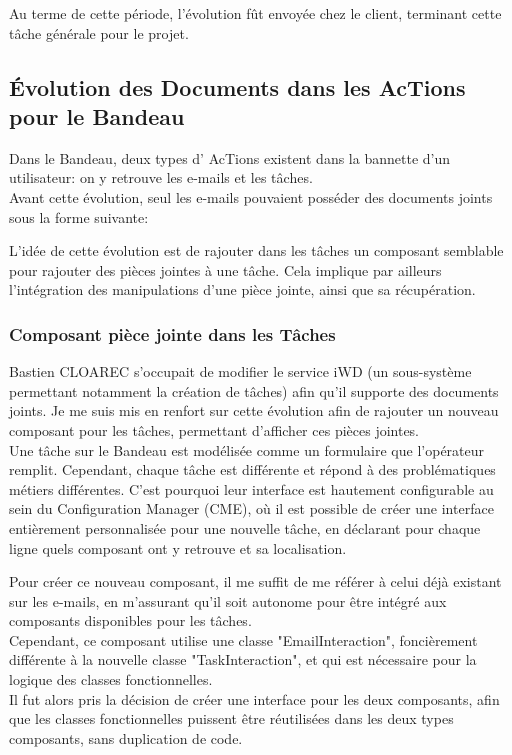 \documentclass{rapport}
\begin{document}
Au terme de cette période, l'évolution fût envoyée chez le client, terminant cette tâche générale pour le projet.

\newpage
\subsection{Évolution des Documents dans les AcTions pour le Bandeau}

Dans le Bandeau, deux types d' AcTions existent dans la bannette d'un utilisateur: on y retrouve les e-mails et les tâches.\\
Avant cette évolution, seul les e-mails pouvaient posséder des documents joints sous la forme suivante:


L'idée de cette évolution est de rajouter dans les tâches un composant semblable pour rajouter des pièces jointes à une tâche. Cela implique par ailleurs l'intégration des manipulations d'une pièce jointe, ainsi que sa récupération.\\

\subsubsection{Composant pièce jointe dans les Tâches}

Bastien CLOAREC s'occupait de modifier le service iWD (un sous-système permettant notamment la création de tâches) afin qu'il supporte des documents joints. Je me suis mis en renfort sur cette évolution afin de rajouter un nouveau composant pour les tâches, permettant d'afficher ces pièces jointes.\\

Une tâche sur le Bandeau est modélisée comme un formulaire que l'opérateur remplit. Cependant, chaque tâche est différente et répond à des problématiques métiers différentes. C'est pourquoi leur interface est hautement configurable au sein du Configuration Manager (CME), où il est possible de créer une interface entièrement personnalisée pour une nouvelle tâche, en déclarant pour chaque ligne quels composant ont y retrouve et sa localisation.


Pour créer ce nouveau composant, il me suffit de me référer à celui déjà existant sur les e-mails, en m'assurant qu'il soit autonome pour être intégré aux composants disponibles pour les tâches.\\
Cependant, ce composant utilise une classe "EmailInteraction", foncièrement différente à la nouvelle classe "TaskInteraction", et qui est nécessaire pour la logique des classes fonctionnelles.\\
Il fut alors pris la décision de créer une interface pour les deux composants, afin que les classes fonctionnelles puissent être réutilisées dans les deux types composants, sans duplication de code. \\
\end{document}
